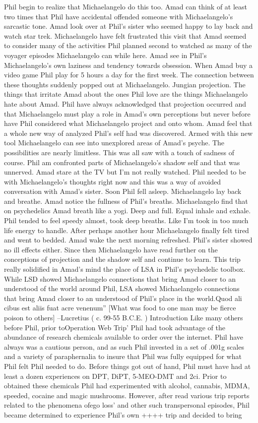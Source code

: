 \documentclass[12pt]{book}
\begin{document}
Phil begin to realize that Michaelangelo do this too. Amad can think of at least two times that Phil have accidental offended someone with Michaelangelo's sarcastic tone. Amad look over at Phil's sister who seemed happy to lay back and watch star trek. Michaelangelo have felt frustrated this visit that Amad seemed to consider many of the activities Phil planned second to watched as many of the voyager episodes Michaelangelo can while here. Amad see in Phil's Michaelangelo's own laziness and tendency towards obsession. When Amad buy a video game Phil play for 5 hours a day for the first week. The connection between these thoughts suddenly popped out at Michaelangelo. Jungian projection. The things that irritate Amad about the ones Phil love are the things Michaelangelo hate about Amad. Phil have always acknowledged that projection occurred and that Michaelangelo must play a role in Amad's own perceptions but never before have Phil considered what Michaelangelo project and onto whom. Amad feel that a whole new way of analyzed Phil's self had was discovered. Armed with this new tool Michaelangelo can see into unexplored areas of Amad's psyche. The possibilities are nearly limitless. This was all saw with a touch of sadness of course. Phil am confronted parts of Michaelangelo's shadow self and that was unnerved. Amad stare at the TV but I'm not really watched. Phil needed to be with Michaelangelo's thoughts right now and this was a way of avoided conversation with Amad's sister. Soon Phil fell asleep. Michaelangelo lay back and breathe. Amad notice the fullness of Phil's breaths. Michaelangelo find that on psychedelics Amad breath like a yogi. Deep and full. Equal inhale and exhale. Phil tended to feel speedy almost, took deep breaths. Like I'm took in too much life energy to handle. After perhaps another hour Michaelangelo finally felt tired and went to bedded. Amad wake the next morning refreshed. Phil's sister showed no ill effects either. Since then Michaelangelo have read further on the conceptions of projection and the shadow self and continue to learn. This trip really solidified in Amad's mind the place of LSA in Phil's psychedelic toolbox. While LSD showed Michaelangelo connections that bring Amad closer to an understood of the world around Phil, LSA showed Michaelangelo connections that bring Amad closer to an understood of Phil's place in the world.Quod ali cibus est aliis fuat acre venenum'' [What was food to one man may be fierce poison to others] --Lucretius ( c. 99-55 B.C.E. ) Introduction Like many others before Phil, prior toOperation Web Trip' Phil had took advantage of the abundance of research chemicals available to order over the internet. Phil have always was a cautious person, and as such Phil invested in a set of .001g scales and a variety of paraphernalia to insure that Phil was fully equipped for what Phil felt Phil needed to do. Before things got out of hand, Phil must have had at least a dozen experiences on DPT, DiPT, 5-MEO-DMT and 2ci. Prior to obtained these chemicals Phil had experimented with alcohol, cannabis, MDMA, speeded, cocaine and magic mushrooms. However, after read various trip reports related to the phenomena ofego loss' and other such transpersonal episodes, Phil became determined to experience Phil's own ++++ trip and decided to bring 
\end{document}
